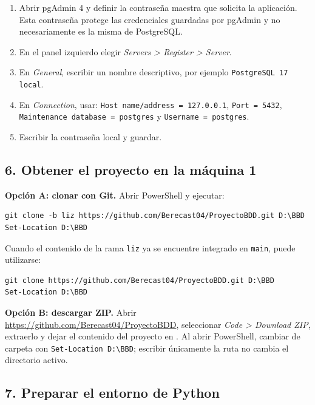 \documentclass[12pt,letterpaper]{article}
\newcommand{\ruta}[1]{\texttt{\detokenize{#1}}}
\begin{document}
\begin{enumerate}
  \item Abrir pgAdmin 4 y definir la contraseña maestra que solicita la
        aplicación. Esta contraseña protege las credenciales guardadas por
        pgAdmin y no necesariamente es la misma de PostgreSQL.
  \item En el panel izquierdo elegir \textit{Servers > Register > Server}.
  \item En \textit{General}, escribir un nombre descriptivo, por ejemplo
        \texttt{PostgreSQL 17 local}.
  \item En \textit{Connection}, usar:
        \texttt{Host name/address = 127.0.0.1},
        \texttt{Port = 5432},
        \texttt{Maintenance database = postgres} y
        \texttt{Username = postgres}.
  \item Escribir la contraseña local y guardar.
\end{enumerate}

\subsection{6. Obtener el proyecto en la máquina 1}

\textbf{Opción A: clonar con Git.} Abrir PowerShell y ejecutar:

\begin{lstlisting}
git clone -b liz https://github.com/Berecast04/ProyectoBDD.git D:\BBD
Set-Location D:\BBD
\end{lstlisting}

Cuando el contenido de la rama \texttt{liz} ya se encuentre integrado en
\texttt{main}, puede utilizarse:

\begin{lstlisting}
git clone https://github.com/Berecast04/ProyectoBDD.git D:\BBD
Set-Location D:\BBD
\end{lstlisting}

\textbf{Opción B: descargar ZIP.} Abrir
\url{https://github.com/Berecast04/ProyectoBDD}, seleccionar
\textit{Code > Download ZIP}, extraerlo y dejar el contenido del proyecto en
\ruta{D:/BBD}. Al abrir PowerShell, cambiar de carpeta con
\texttt{Set-Location D:\textbackslash BBD}; escribir únicamente la ruta no
cambia el directorio activo.

\subsection{7. Preparar el entorno de Python}
\end{document}
